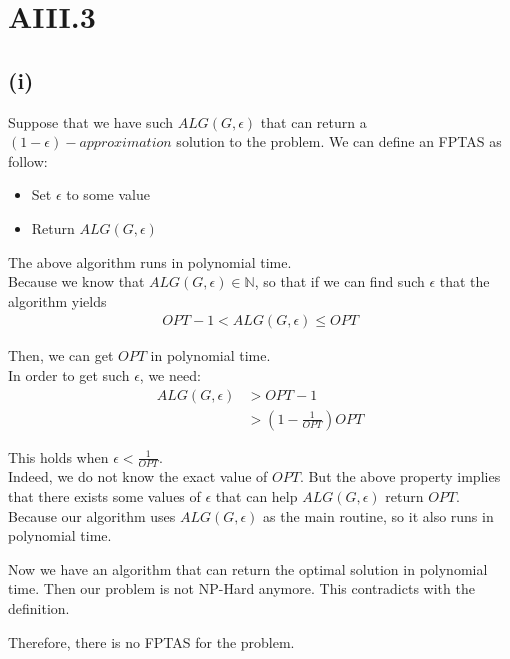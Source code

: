 \section* {AIII.3}
\label {a3-3}
\subsection*{(i)}
Suppose that we have such $ALG(G,\epsilon)$ that can return a $(1 - \epsilon )-approximation$ solution to the problem. We can define an FPTAS as follow:
\begin{itemize}
	\item Set $\epsilon$ to some value
	\item Return $ALG(G,\epsilon)$
\end{itemize}

The above algorithm runs in polynomial time. \\

Because we know that $ALG(G,\epsilon) \in \mathbb{N}$, so that if we can find such $\epsilon$ that the algorithm yields
\begin{align*}
	OPT - 1 < ALG\left(G,\epsilon \right) \leq OPT
\end{align*}

Then, we can get $OPT$ in polynomial time.\\

In order to get such $\epsilon$, we need:
\begin{align*}
	ALG\left(G,\epsilon\right) &> OPT - 1\\
	&> \left( 1 - \frac{1}{OPT} \right)OPT
\end{align*}
%	

This holds when $\epsilon < \frac{1}{OPT}$.\\

Indeed, we do not know the exact value of $OPT$. But the above property implies that there exists some values of $\epsilon$ that can help $ALG(G,\epsilon)$ return $OPT$. Because our algorithm uses $ALG(G,\epsilon)$ as the main routine, so it also runs in polynomial time.

Now we have an algorithm that can return the optimal solution in polynomial time. Then our problem is not NP-Hard anymore. This contradicts with the definition.

Therefore, there is no FPTAS for the problem.

